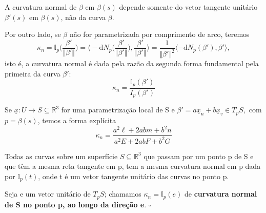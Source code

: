 \documentclass[../differential_geometry.tex]{subfiles}
\begin{document}
\begin{tcolorbox}[
		skin=enhanced,
		title=Observação,
		fonttitle=\bfseries,
		colframe=black,
		colbacktitle=cyan!75!white,
		colback=cyan!15,
		colbacklower=black,
		coltitle=black,
		drop fuzzy shadow,
	]
	A curvatura normal de \(\beta \) em \(\beta (s)\) depende somente do vetor tangente unitário \(\beta '(s)\) em \(\beta (s)\), não da curva \(\beta \).
\end{tcolorbox}

Por outro lado, se \(\beta \) não for parametrizada por comprimento de arco, teremos
\[
	\kappa_{n}=\mathbb{I}_{p}\biggl(\frac{\beta '}{\Vert \beta ' \Vert}\biggr) = \biggl\langle -\mathrm{d}N_{p}\biggl(\frac{\beta '}{\Vert \beta ' \Vert}\biggr), \frac{\beta '}{\Vert \beta ' \Vert} \biggr\rangle = \frac{1}{\Vert \beta'  \Vert^{2}}\langle -\mathrm{d}N_{p}(\beta '), \beta ' \rangle,
\]
isto é, a curvatura normal é dada pela razão da segunda forma fundamental pela primeira da curva \(\beta '\):
\[
	\boxed{\kappa_{n}= \frac{\mathbb{I}_{p}(\beta ')}{I_{p}(\beta ')}}
\]

Se \(\underline{x}:U\rightarrow S \subseteq \mathbb{R}^{3}\) for uma parametrização local de S e \(\beta '=a \underline{x}_{n} + b \underline{x}_{v}\in T_{p}S,\) com \(p = \beta (s)\), temos a forma explícita
\[
	\boxed{\kappa_{n} = \frac{a^{2}\ell +2ab m + b^{2}n}{a^{2}E+2abF+b^{2}G}}
\]

\hypertarget{meusnier_theorem}{
	\begin{theorem*}[Meusnier]
		Todas as curvas sobre um superfície \(S\subseteq \mathbb{R}^{3}\) que passam por um ponto p de S e que têm a mesma reta tangente em p, tem a mesma curvatura normal em p dada por \(\mathbb{I}_{p}(t)\), onde t é um vetor tangente unitário das curvas no ponto p.
	\end{theorem*}
}
\begin{def*}
	Seja e um vetor unitário de \(T_{p}S\); chamamos \(\kappa_{n} = \mathbb{I}_{p}(e)\) de \textbf{curvatura normal de S no ponto p, ao longo da direção e}. \(\square\)
\end{def*}
\end{document}
